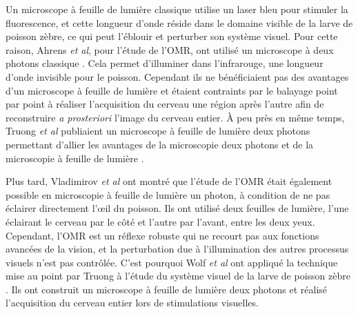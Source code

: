 

Un microscope à feuille de lumière classique utilise un laser bleu pour stimuler la fluorescence, et cette longueur d'onde réside dans le domaine visible de la larve de poisson zèbre, ce qui peut l'éblouir et perturber son système visuel. Pour cette raison, Ahrens \emph{et al}, pour l'étude de l'OMR, ont utilisé un microscope à deux photons classique \cite{ahrens_brain-wide_2012}. Cela permet d'illuminer dans l'infrarouge, une longueur d'onde invisible pour le poisson. Cependant ils ne bénéficiaient pas des avantages d'un microscope à feuille de lumière et étaient contraints par le balayage point par point à réaliser l'acquisition du cerveau une région après l'autre afin de reconstruire \emph{a prosteriori} l'image du cerveau entier. À peu près en même temps, Truong \emph{et al} publiaient un microscope à feuille de lumière deux photons permettant d'allier les avantages de la microscopie deux photons et de la microscopie à feuille de lumière \cite{truong_deep_2011}.



Plus tard, Vladimirov \emph{et al} \cite{vladimirov_light-sheet_2014} ont montré que l'étude de l'OMR était également possible en microscopie à feuille de lumière un photon, à condition de ne pas éclairer directement l'œil du poisson. Ils ont utilisé deux feuilles de lumière, l'une éclairant le cerveau par le côté et l'autre par l'avant, entre les deux yeux. Cependant, l'OMR est un réflexe robuste qui ne recourt pas aux fonctions avancées de la vision, et la perturbation due à l'illumination des autres processus visuels n'est pas contrôlée. C'est pourquoi Wolf \emph{et al} ont appliqué la technique mise au point par Truong à l'étude du système visuel de la larve de poisson zèbre \cite{wolf_whole-brain_2015}. Ils ont construit un microscope à feuille de lumière deux photons et réalisé l'acquisition du cerveau entier lors de stimulations visuelles.

